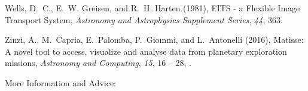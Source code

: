 \begin{thebibliography}{22}
{Wells}, D.~C., E.~W. {Greisen}, and R.~H. {Harten} (1981), {FITS - a Flexible
  Image Transport System}, \textit{Astronomy and Astrophysics Supplement
  Series}, \textit{44}, 363.

Zinzi, A., M.~Capria, E.~Palomba, P.~Giommi, and L.~Antonelli (2016), Matisse:
  A novel tool to access, visualize and analyse data from planetary exploration
  missions, \textit{Astronomy and Computing}, \textit{15}, 16 -- 28,
  .

\end{thebibliography}




\listofchanges






More Information and Advice:

%
%


